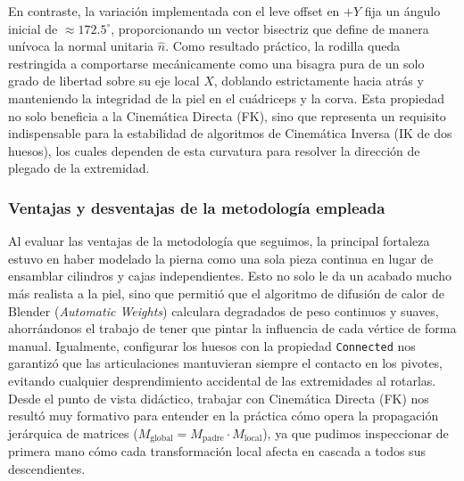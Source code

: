 En contraste, la variación implementada con el leve offset en $+Y$ fija un ángulo inicial de $\approx 172.5^\circ$, proporcionando un vector bisectriz que define de manera unívoca la normal unitaria $\hat{n}$. Como resultado práctico, la rodilla queda restringida a comportarse mecánicamente como una bisagra pura de un solo grado de libertad sobre su eje local $X$, doblando estrictamente hacia atrás y manteniendo la integridad de la piel en el cuádriceps y la corva. Esta propiedad no solo beneficia a la Cinemática Directa (FK), sino que representa un requisito indispensable para la estabilidad de algoritmos de Cinemática Inversa (IK de dos huesos), los cuales dependen de esta curvatura para resolver la dirección de plegado de la extremidad.

\subsubsection{Ventajas y desventajas de la metodología empleada}

Al evaluar las ventajas de la metodología que seguimos, la principal fortaleza estuvo en haber modelado la pierna como una sola pieza continua en lugar de ensamblar cilindros y cajas independientes. Esto no solo le da un acabado mucho más realista a la piel, sino que permitió que el algoritmo de difusión de calor de Blender (\textit{Automatic Weights}) calculara degradados de peso continuos y suaves, ahorrándonos el trabajo de tener que pintar la influencia de cada vértice de forma manual. Igualmente, configurar los huesos con la propiedad \texttt{Connected} nos garantizó que las articulaciones mantuvieran siempre el contacto en los pivotes, evitando cualquier desprendimiento accidental de las extremidades al rotarlas. Desde el punto de vista didáctico, trabajar con Cinemática Directa (FK) nos resultó muy formativo para entender en la práctica cómo opera la propagación jerárquica de matrices ($M_{\text{global}} = M_{\text{padre}} \cdot M_{\text{local}}$), ya que pudimos inspeccionar de primera mano cómo cada transformación local afecta en cascada a todos sus descendientes.

